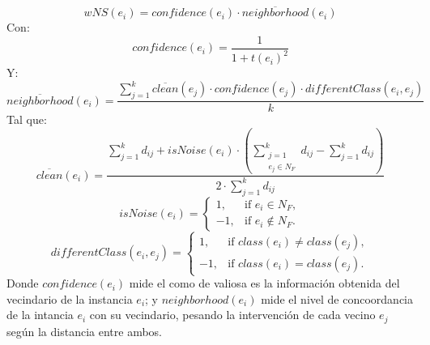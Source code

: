 \documentclass[print, color]{ugrTFG}
\begin{document}
\begin{itemize}
\begin{enumerate}
            \begin{equation}\label{eq:cncnos_wNS}
                wNS(e_i) = confidence(e_i) \cdot \overline{neighborhood}(e_i)
            \end{equation}
            Con:
            \begin{equation}
                confidence(e_i) = \frac{1}{1 + t(e_i)^2}
            \end{equation}
            Y:
            \begin{equation}
                \overline{neighborhood}(e_i) =
                \frac{
                \sum_{j=1}^{k}
                \overline{clean}(e_j) \cdot confidence(e_j) \cdot differentClass(e_i, e_j)
                }{k}
            \end{equation}
            Tal que:
            \begin{equation}
                \overline{clean}(e_i) =
                \frac{
                \sum_{j=1}^{k} d_{ij}
                +
                isNoise(e_i) \cdot
                \left(
                \sum_{\substack{j=1 \\ e_j \in N_F}}^{k} d_{ij}
                -
                \sum_{j=1}^{k} d_{ij}
                \right)
                }{
                2 \cdot \sum_{j=1}^{k} d_{ij}
                }
            \end{equation}
            \begin{equation}
                isNoise(e_i) =
                \begin{cases}
                1, & \text{if } e_i \in N_F,\\
                -1, & \text{if } e_i \notin N_F.
                \end{cases}
            \end{equation}
            \begin{equation}
                differentClass(e_i, e_j) =
                \begin{cases}
                1, & \text{if } class(e_i) \neq class(e_j),\\
                -1, & \text{if } class(e_i) = class(e_j).
                \end{cases}
            \end{equation}
            Donde $confidence(e_i)$ mide el como de valiosa es la información obtenida del vecindario de la instancia $e_i$; y $neighborhood(e_i)$ mide el nivel de concoordancia de la intancia $e_i$ con su vecindario, pesando la intervención de cada vecino $e_j$ según la distancia entre ambos. 


\end{enumerate}
\end{itemize}
\end{document}
